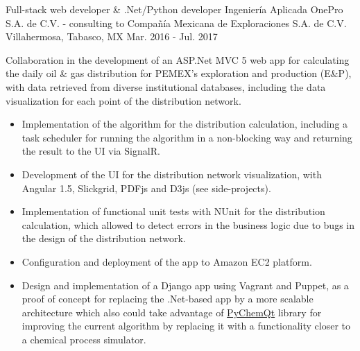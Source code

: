 \begin{cventries}
\cventry
{Full-stack web developer \& .Net/Python developer} %
{Ingeniería Aplicada OnePro S.A. de C.V. - consulting to Compañía Mexicana de Exploraciones S.A. de C.V.} %
{Villahermosa, Tabasco, MX} %
{Mar. 2016 - Jul. 2017} %
{ %
	\begin{cvitems}
		\item {Collaboration in the development of an ASP.Net MVC 5 web app for calculating the daily oil \& gas distribution for PEMEX's exploration and production (E\&P), with data retrieved from diverse institutional databases, including the data visualization for each point of the distribution network.}
		\begin{itemize}
			\item {Implementation of the algorithm for the distribution calculation, including a task scheduler for running the algorithm in a non-blocking way and returning the result to the UI via SignalR.}
			\item {Development of the UI for the distribution network visualization, with Angular 1.5, Slickgrid, PDFjs and D3js {\tiny (see side-projects)}.}
			\item {Implementation of functional unit tests with NUnit for the distribution calculation, which allowed to detect errors in the business logic due to bugs in the design of the distribution network.}
			\item {Configuration and deployment of the app to Amazon EC2 platform.}
			\item {Design and implementation of a Django app using Vagrant and Puppet, as a proof of concept for replacing the .Net-based app by a more scalable architecture which also could take advantage of \href{https://github.com/jjgomera/pychemqt}{PyChemQt} library for improving the current algorithm by replacing it with a functionality closer to a chemical process simulator.}
		\end{itemize}
	\end{cvitems}
}



\end{cventries}
